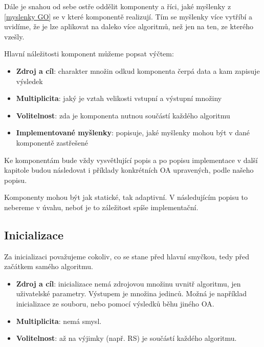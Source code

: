 Dále je snahou od sebe ostře oddělit komponenty a říci, jaké myšlenky z \ref{myslenky GO} se v které komponentě realizují. Tím se myšlenky více vytříbí a uvidíme, že je lze aplikovat na daleko více algoritmů, než jen na ten, ze kterého vzešly.

Hlavní náležitosti komponent můžeme popsat výčtem:
\begin{itemize}
  \item \textbf{Zdroj a cíl}: charakter množin odkud komponenta čerpá data a kam zapisuje výsledek
  \item \textbf{Multiplicita}: jaký je vztah velikosti vstupní a výstupní množiny
  \item \textbf{Volitelnost}: zda je komponenta nutnou součástí každého algoritmu
  \item \textbf{Implementované myšlenky}: popisuje, jaké myšlenky mohou být v dané komponentě zastřešené
\end{itemize}
Ke komponentám bude vždy vysvětlující popis a po popisu implementace v další kapitole budou následovat i příklady konkrétních OA upravených, podle našeho popisu.

Komponenty mohou být jak statické, tak adaptivní. V následujícím popisu to nebereme v úvahu, neboť je to záležitost spíše implementační.


\subsection{Inicializace}\label{def inicializace}

Za inicializaci považujeme cokoliv, co se stane před hlavní smyčkou, tedy před začátkem samého algoritmu.
\begin{itemize}
  \item \textbf{Zdroj a cíl}: inicializace nemá zdrojovou množinu uvnitř algoritmu, jen uživatelské parametry. Výstupem je množina jedinců. Možná je například inicializace ze souboru, nebo pomocí výsledků běhu jiného OA.
  \item \textbf{Multiplicita}: nemá smysl.
  \item \textbf{Volitelnost}: až na výjimky (např. RS) je součástí každého algoritmu.
\end{itemize}

